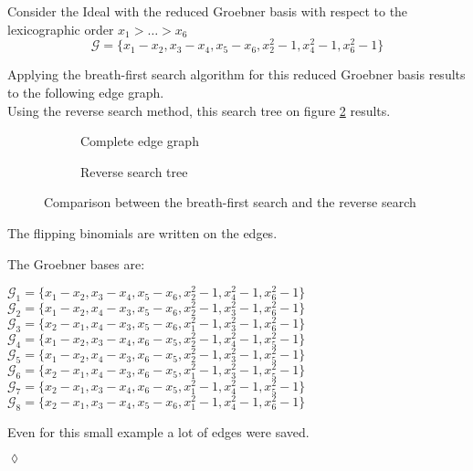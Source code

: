 \begin{env_example}\normalfont
Consider the Ideal with the reduced Groebner basis with respect to the lexicographic order $x_{1} > \ldots > x_{6} $
\[ \mathcal{G} = \{x_{1} - x_{2}, x_{3} - x_{4}, x_{5}-x_{6} , x_{2}^{2} -1 , x_{4}^{2} - 1, x_{6}^{2} - 1 \} \]

Applying the breath-first search algorithm for this reduced Groebner basis results to the following edge graph.\\
Using the reverse search method, this search tree on figure \ref{fig:reverse} results.


\begin{figure}[h]
    \centering
    \begin{subfigure}[b]{0.48\linewidth}        %
        \centering
        
        \caption{Complete edge graph}
        \label{fig:breadth}
    \end{subfigure}
    \begin{subfigure}[b]{0.48\linewidth}        %
        \centering
        
        \caption{Reverse search tree}
        \label{fig:reverse}
    \end{subfigure}
    \caption{Comparison between the breath-first search and the reverse search}
    \label{fig:graph}
\end{figure}
\newpage
The flipping binomials are written on the edges.

The Groebner bases are:
\begin{center}
$\mathcal{G}_{1} = \{x_{1}-x_{2},x_{3}-x_{4},x_{5}-x_{6},x_{2}^{2}-1,x_{4}^{2}-1,x_{6}^{2}-1 \} $ \\
$\mathcal{G}_{2} = \{x_{1}-x_{2},x_{4}-x_{3},x_{5}-x_{6},x_{2}^{2}-1,x_{3}^{2}-1,x_{6}^{2}-1 \} $ \\
$\mathcal{G}_{3} = \{x_{2}-x_{1},x_{4}-x_{3},x_{5}-x_{6},x_{1}^{2}-1,x_{3}^{2}-1,x_{6}^{2}-1 \} $ \\
$\mathcal{G}_{4} = \{x_{1}-x_{2},x_{3}-x_{4},x_{6}-x_{5},x_{2}^{2}-1,x_{4}^{2}-1,x_{5}^{2}-1 \} $ \\
$\mathcal{G}_{5} = \{x_{1}-x_{2},x_{4}-x_{3},x_{6}-x_{5},x_{2}^{2}-1,x_{3}^{2}-1,x_{5}^{2}-1 \} $ \\
$\mathcal{G}_{6} = \{x_{2}-x_{1},x_{4}-x_{3},x_{6}-x_{5},x_{1}^{2}-1,x_{3}^{2}-1,x_{5}^{2}-1 \} $ \\
$\mathcal{G}_{7} = \{x_{2}-x_{1},x_{3}-x_{4},x_{6}-x_{5},x_{1}^{2}-1,x_{4}^{2}-1,x_{5}^{2}-1 \} $ \\
$\mathcal{G}_{8} = \{x_{2}-x_{1},x_{3}-x_{4},x_{5}-x_{6},x_{1}^{2}-1,x_{4}^{2}-1,x_{6}^{2}-1 \} $ \\
\end{center}

Even for this small example a lot of edges were saved.
\begin{flushright}
$\lozenge$
\end{flushright}
\end{env_example}




